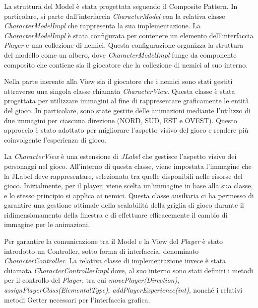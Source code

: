 \documentclass[a4paper,12pt]{report}
\begin{document}
La struttura del Model è stata progettata seguendo il Composite Pattern. In particolare, si parte dall'interfaccia \textit{CharacterModel} con la relativa classe \textit{CharacterModelImpl} che rappresenta la sua implementazione. La \textit{CharacterModelImpl} è stata configurata per contenere un elemento dell'interfaccia \textit{Player} e una collezione di nemici. Questa configurazione organizza la struttura del modello come un albero, dove \textit{CharacterModelImpl} funge da componente composito che contiene sia il giocatore che la collezione di nemici al suo interno.

Nella parte inerente alla View sia il giocatore che i nemici sono stati gestiti attraverso una singola classe chiamata \textit{CharacterView}. Questa classe è stata progettata per utilizzare immagini al fine di rappresentare graficamente le entità del gioco. In particolare, sono state gestite delle animazioni mediante l'utilizzo di due immagini per ciascuna direzione (NORD, SUD, EST e OVEST). Questo approccio è stato adottato per migliorare l'aspetto visivo del gioco e rendere più coinvolgente l'esperienza di gioco. 

La \textit{CharacterView} è una estensione di \textit{JLabel} che gestisce l'aspetto visivo dei personaggi nel gioco. All'interno di questa classe, viene impostata l'immagine che la JLabel deve rappresentare, selezionata tra quelle disponibili nelle risorse del gioco. Inizialmente, per il player, viene scelta un'immagine in base alla sua classe, e lo stesso principio si applica ai nemici. Questa classe ausiliaria ci ha permesso di garantire una gestione ottimale della scalabilità della griglia di gioco durante il ridimensionamento della finestra e di effettuare efficacemente il cambio di immagine per le animazioni.

Per garantire la comunicazione tra il Model e la View del \textit{Player} è stato introdotto un Controller, sotto forma di interfaccia, denominato \textit{CharacterController}. La relativa classe di implementazione invece è stata chiamata \textit{CharacterControllerImpl} dove, al suo interno sono stati definiti i metodi per il controllo del \textit{Player}, tra cui \textit{movePlayer(Direction)}, \textit{assignPlayerClass(ElementalType)}, \textit{addPlayerExperience(int)}, nonché i relativi metodi Getter necessari per l'interfaccia grafica.
\end{document}
